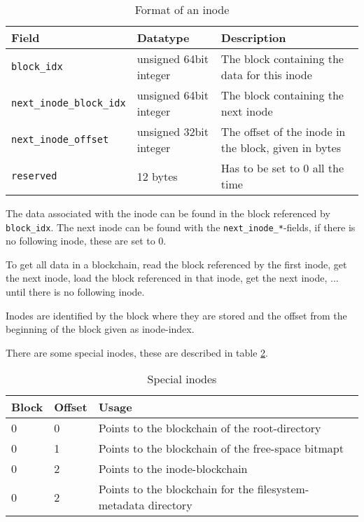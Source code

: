 \documentclass[a4paper,12pt]{article}
\begin{document}
			\begin{table}[ht]
				\caption{Format of an inode}\label{tab:1}
				\begin{tabularx}{\linewidth}{|l|l|X|} \hline
					\textbf{Field} 					& \textbf{Datatype} 		& \textbf{Description} \\ \hline
					\verb|block_idx| 				& unsigned 64bit integer 	& The block containing the data for this inode \\ \hline
					\verb|next_inode_block_idx| 	& unsigned 64bit integer 	& The block containing the next inode \\ \hline
					\verb|next_inode_offset| 		& unsigned 32bit integer	& The offset of the inode in the block, given in bytes \\ \hline
					\verb|reserved|					& 12 bytes					& Has to be set to 0 all the time \\ \hline
				\end{tabularx}
			\end{table}
			
			The data associated with the inode can be found in the block referenced by \verb|block_idx|. The next inode can be found with the \verb|next_inode_*|-fields, if there is no following inode, these are set to 0.
		
			To get all data in a blockchain, read the block referenced by the first inode, get the next inode, load the block referenced in that inode, get the next inode, ... until there is no following inode.
			
			Inodes are identified by the block where they are stored and the offset from the beginning of the block given as inode-index.
			
			There are some special inodes, these are described in table \ref{tab:2}.		
		
			\begin{table}[ht]
				\caption{Special inodes}\label{tab:2}
				\begin{tabularx}{\linewidth}{|l|l|X|} \hline
					\textbf{Block} 	& \textbf{Offset} 	& \textbf{Usage} \\ \hline
					0				& 0 				& Points to the blockchain of the root-directory \\ \hline
					0				& 1 				& Points to the blockchain of the free-space bitmapt \\ \hline
					0				& 2					& Points to the inode-blockchain \\ \hline
					0				& 2					& Points to the blockchain for the filesystem-metadata directory \\ \hline
				\end{tabularx}
			\end{table}
		
\end{document}
